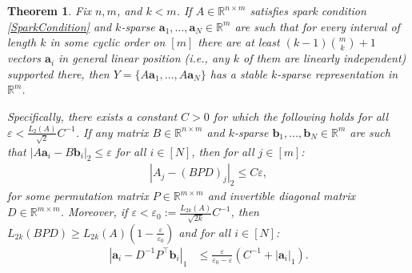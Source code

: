 \documentclass[journal, twocolumn]{IEEEtran}
\newtheorem{theorem}{Theorem}
\begin{document}
\begin{theorem}\label{DeterministicUniquenessTheorem}
Fix $n, m$, and $k < m$. If $A \in \mathbb{R}^{n \times m}$ satisfies spark condition \eqref{SparkCondition} and $k$-sparse \mbox{$\mathbf{a}_1, \ldots, \mathbf{a}_N \in \mathbb{R}^m$} are such that for every interval of length $k$ in some cyclic order on $[m]$ there are at least \mbox{$(k-1){m \choose k}+1$} vectors $\mathbf{a}_i$ in general linear position (i.e., any $k$ of them are linearly independent) supported there, then $Y = \{A\mathbf{a}_1, \ldots, A\mathbf{a}_N\}$ has a stable $k$-sparse representation in $\mathbb{R}^m$.

Specifically, there exists a constant $C > 0$ for which the following holds for all $\varepsilon < \frac{L_2(A)}{\sqrt{2}}C^{-1}$. If any matrix $B \in \mathbb{R}^{n \times m}$ and $k$-sparse $\mathbf{b}_1, \ldots, \mathbf{b}_N \in \mathbb{R}^m$ are such that \mbox{$|A\mathbf{a}_i - B\mathbf{b}_i|_2 \leq \varepsilon$} for all $i \in [N]$, then for all $j \in [m]$:
\begin{align}\label{Cstable}
|A_j-(BPD)_j|_2 \leq C\varepsilon,
\end{align}
%
for some permutation matrix $P \in \mathbb{R}^{m \times m}$ and invertible diagonal matrix $D \in \mathbb{R}^{m \times m}$.  Moreover, if $\varepsilon < \varepsilon_0 := \frac{L_{2k}(A)}{\sqrt{2k}}C^{-1}$, then $L_{2k}(BPD) \geq L_{2k}(A)\left( 1 - \frac{\varepsilon}{\varepsilon_0} \right)$ and for all $i \in [N]$:
\begin{align}\label{b-PDa}
|\mathbf{a}_i - D^{-1}P^{\top}\mathbf{b}_i|_1 &\leq \frac{\varepsilon }{ \varepsilon_0 - \varepsilon} \left( C^{-1}+|\mathbf{a}_i|_1 \right).
\end{align}
\end{theorem}

\end{document}
